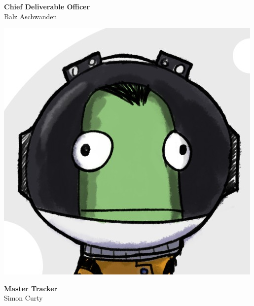\documentclass{beamer}
\begin{document}
\begin{frame}
\begin{minipage}{.2\textwidth}
  \end{minipage}%
  \hfill
  \begin{minipage}{.8\textwidth}
    \textbf{Chief Deliverable Officer} \\ Balz Aschwanden \pause \\    
  \end{minipage}
  \begin{minipage}{.2\textwidth}
    \includegraphics[height=.2\textheight]{balz}
  \end{minipage}%
  \hfill
  \begin{minipage}{.8\textwidth}
    \textbf{Master Tracker} \\ Simon Curty \pause \\    
  \end{minipage}
  \begin{minipage}{.2\textwidth}

\end{minipage}
\end{frame}
\end{document}
